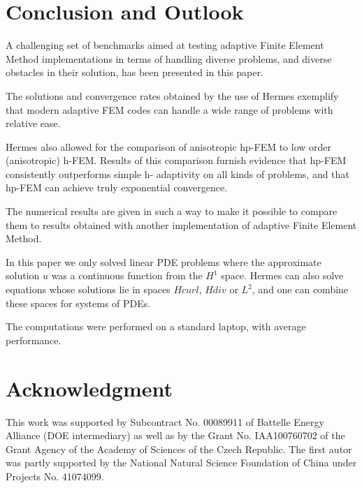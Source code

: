 \documentclass[12pt]{elsarticle}
\begin{document}

\section{Conclusion and Outlook}
\label{sec:conclusion}

A challenging set of benchmarks aimed at testing adaptive Finite Element Method implementations in terms of handling diverse problems, and diverse obstacles in their solution, has been presented in this paper.

The solutions and convergence rates obtained by the use of Hermes exemplify that modern adaptive FEM codes can handle a wide range of problems with relative ease.

Hermes also allowed for the comparison of anisotropic hp-FEM to low order (anisotropic) h-FEM. Results of this comparison furnish evidence that hp-FEM consistently outperforms simple h- adaptivity on all kinds of problems, and that hp-FEM can achieve truly exponential convergence.

The numerical results are given in such a way to make it possible to compare them to results obtained with another implementation of adaptive Finite Element Method.

In this paper we only solved linear PDE problems where the approximate solution $u$ was a continuous function from the $H^1$ space.
Hermes can also solve equations whose solutions lie in spaces
$Hcurl$, $Hdiv$ or $L^2$, and one can combine these spaces for systems of PDEs.

The computations were performed on a standard laptop, with average performance.

\section{Acknowledgment}

This work was supported by Subcontract No. 00089911 of Battelle
Energy Alliance (DOE intermediary) as well as by the
Grant No. IAA100760702 of the Grant Agency of the Academy
of Sciences of the Czech Republic. The first autor was partly
supported by the National Natural Science Foundation
of China under Projects No. 41074099.
\end{document}
